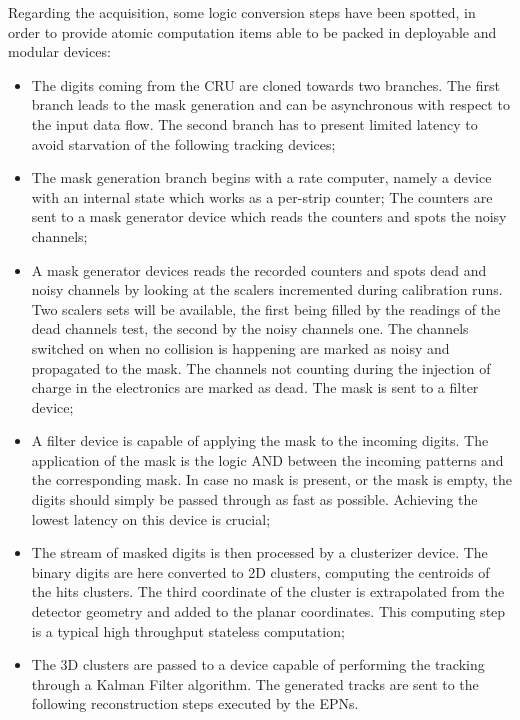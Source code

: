 Regarding the acquisition, some logic conversion steps have been spotted, in order to provide atomic computation items able to be packed in deployable and modular devices:
\begin{itemize}
    \item The digits coming from the CRU are cloned towards two branches.
    The first branch leads to the mask generation and can be asynchronous with respect to the input data flow.
    The second branch has to present limited latency to avoid starvation of the following tracking devices;
    \item The mask generation branch begins with a rate computer, namely a device with an internal state which works as a per-strip counter;
    The counters are sent to a mask generator device which reads the counters and spots the noisy channels;
    \item  A mask generator devices reads the recorded counters and spots dead and noisy channels by looking at the scalers incremented during calibration runs.
    Two scalers sets will be available, the first being filled by the readings of the dead channels test, the second by the noisy channels one.
    The channels switched on when no collision is happening are marked as noisy and propagated to the mask.
    The channels not counting during the injection of charge in the electronics are marked as dead.
    The mask is sent to a filter device;
    \item A filter device is capable of applying the mask to the incoming digits.
    The application of the mask is the logic AND between the incoming patterns and the corresponding mask.
    In case no mask is present, or the mask is empty, the digits should simply be passed through as fast as possible.
    Achieving the lowest latency on this device is crucial;
    \item The stream of masked digits is then processed by a clusterizer device. The binary digits are here converted to 2D clusters, computing the centroids of the hits clusters. 
    The third coordinate of the cluster is extrapolated from the detector geometry and added to the planar coordinates.
    This computing step is a typical high throughput stateless computation;
    \item The 3D clusters are passed to a device capable of performing the tracking through a Kalman Filter algorithm.
    The generated tracks are sent to the following reconstruction steps executed by the EPNs.
\end{itemize}

